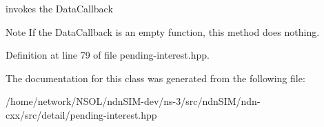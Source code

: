 invokes the Data\+Callback 

\begin{DoxyNote}{Note}
If the Data\+Callback is an empty function, this method does nothing. 
\end{DoxyNote}


Definition at line 79 of file pending-\/interest.\+hpp.



The documentation for this class was generated from the following file\+:\begin{DoxyCompactItemize}
\item 
/home/network/\+N\+S\+O\+L/ndn\+S\+I\+M-\/dev/ns-\/3/src/ndn\+S\+I\+M/ndn-\/cxx/src/detail/pending-\/interest.\+hpp\end{DoxyCompactItemize}
